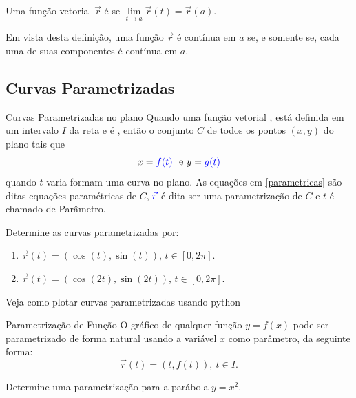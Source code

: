 \begin{frame}[label=fun-vet]
\begin{defin}
Uma função vetorial $\vec{r}$ é  se $\lim\limits_{t\to a}\vec{r}(t)=\vec{r}(a)$.
\end{defin}
Em vista desta definição, uma função $\vec{r}$ é {\color{blue}contínua em $a$} se, e somente se, cada uma de suas {\color{blue}componentes é contínua em $a$}.



\end{frame}

\subsection*{Curvas Parametrizadas}
\begin{frame}[label=fun-vet]{Curvas Parametrizadas no plano}
Quando uma função vetorial , está definida em um intervalo $I$ da reta e  é , então o conjunto {\color{red}$C$} de todos os pontos $(x,y)$ do plano tais que
\begin{equation}\label{parametricas}
x=\textcolor{blue}{f(t)}\ \text{ e } y=\textcolor{blue}{g(t)}
\end{equation}
quando $t$ varia formam uma {\color{red}curva no plano}. As equações em  {\color{red} \eqref{parametricas}} são ditas {\color{red} equações paramétricas de $C$}, $\textcolor{blue}{\vec{r}}$ é dita ser uma {\color{red}parametrização de $C$} e $t$ é chamado de  {\color{red} Parâmetro}.
\begin{exe}
Determine as curvas parametrizadas por:
\begin{enumerate} 
\item $\vec{r}(t)=(\cos(t),\sin(t))$, $t\in [0,2\pi]$.
\item $\vec{r}(t)=(\cos(2t),\sin(2t))$, $t\in [0,2\pi]$.

\end{enumerate}
\end{exe}

Veja como plotar curvas parametrizadas usando python \href{https://reginaldodr.github.io/academic/posts/curvas-parametricas/curvas-parametricas.html}{}

\end{frame}

\begin{frame}[label=fun-vet]
\begin{block}{Parametrização de Função}
O gráfico de qualquer função $y=f(x)$ pode ser parametrizado de forma natural usando a variável $x$ como parâmetro, da seguinte forma:
\[\vec{r}(t)=(t,f(t)),\ t\in I.\]
\end{block}

\begin{exer}
 Determine uma parametrização para a parábola $y=x^2$.
\end{exer}
\end{frame}



